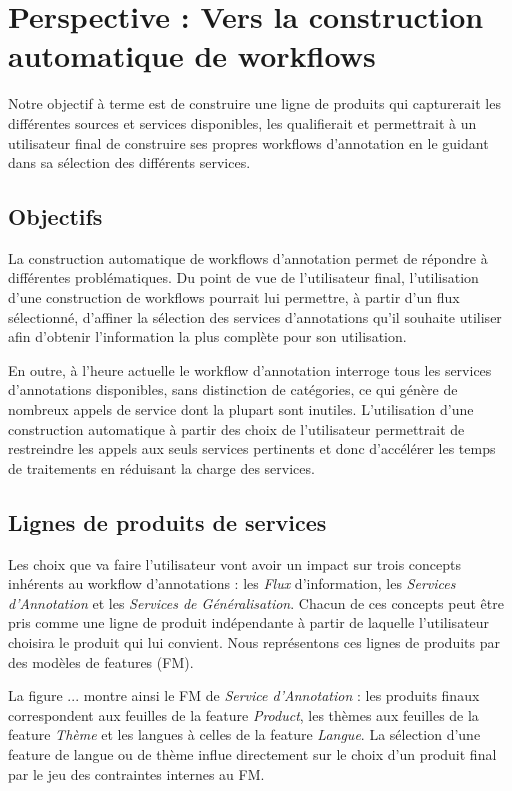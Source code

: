 \documentclass[]{easychair}
\newcommand{\comment}[4]{\par\noindent\hspace*{-0.5cm}{\parbox{\columnwidth}{\textbf{\color{#1}//#2[#3]:#4}}}\par}
\newcommand{\si}[1]{\comment{red}{}{#1}{SI}}
\begin{document}
\section{Perspective : Vers la construction automatique de workflows }
\label{sect:perspectives}
Notre objectif à terme est de construire une ligne de produits qui capturerait les différentes sources et services disponibles, les qualifierait et permettrait à un utilisateur final de construire ses propres workflows d'annotation en le guidant dans sa sélection des différents services.

\subsection{Objectifs}

La construction automatique de workflows d'annotation permet de répondre à différentes problématiques. Du point de vue de l'utilisateur final, l'utilisation d'une construction de workflows pourrait lui permettre, à partir d'un flux sélectionné, d'affiner la sélection des services d'annotations qu'il souhaite utiliser afin d'obtenir l'information la plus complète pour son utilisation.

En outre, à l'heure actuelle le workflow d'annotation interroge tous les services d'annotations disponibles, sans distinction de catégories, ce qui génère de nombreux appels de service dont la plupart sont inutiles. L'utilisation d'une construction automatique à partir des choix de l'utilisateur permettrait de restreindre les appels aux seuls services pertinents et donc d'accélérer les temps de traitements en réduisant la charge des services. 

\subsection{Lignes de produits de services}
Les choix que va faire l'utilisateur vont avoir un impact sur trois concepts inhérents au workflow d'annotations : les \textit{Flux} d'information, les \textit{Services d'Annotation} et les \textit{Services de Généralisation}. Chacun de ces concepts peut être pris comme une ligne de produit indépendante à partir de laquelle l'utilisateur choisira le produit qui lui convient. Nous représentons ces lignes de produits par des modèles de features (FM).
\si{Réf FM / SPL - Expliquer choix de la SPL ?}

La figure ... montre ainsi le FM de \textit{Service d'Annotation} : les produits finaux correspondent aux feuilles de la feature \textit{Product}, les thèmes aux feuilles de la feature \textit{Thème} et les langues à celles de la feature \textit{Langue}. La sélection d'une feature de langue ou de thème influe directement sur le choix d'un produit final par le jeu des contraintes internes au FM. 
\end{document}
